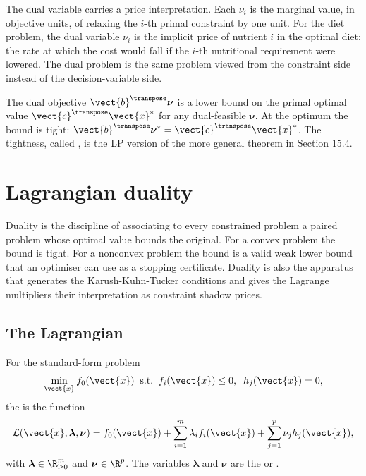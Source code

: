 The dual variable carries a price interpretation. Each $\nu_{i}$
is the marginal value, in objective units, of relaxing the
$i$-th primal constraint by one unit. For the diet problem, the
dual variable $\nu_{i}$ is the implicit price of nutrient $i$ in
the optimal diet: the rate at which the cost would fall if the
$i$-th nutritional requirement were lowered. The dual problem is
the same problem viewed from the constraint side instead of the
decision-variable side.

The dual objective $\vect{b}^{\transpose} \boldsymbol{\nu}$ is a
lower bound on the primal optimal value $\vect{c}^{\transpose}
\vect{x}^{*}$ for any dual-feasible $\boldsymbol{\nu}$. At the
optimum the bound is tight: $\vect{b}^{\transpose}
\boldsymbol{\nu}^{*} = \vect{c}^{\transpose} \vect{x}^{*}$. The
tightness, called , is the LP version of
the more general theorem in Section 15.4.

\section{Lagrangian duality}

Duality is the discipline of associating to every constrained
problem a paired problem whose optimal value bounds the original.
For a convex problem the bound is tight. For a nonconvex problem
the bound is a valid weak lower bound that an optimiser can use
as a stopping certificate. Duality is also the apparatus that
generates the Karush-Kuhn-Tucker conditions and gives the
Lagrange multipliers their interpretation as constraint shadow
prices.

\subsection{The Lagrangian}

\begin{definition}[Lagrangian]
For the standard-form problem
\[
\min_{\vect{x}} f_{0}(\vect{x}) \;\;\text{s.t.}\;\; f_{i}(\vect{x})
\leq 0, \;\; h_{j}(\vect{x}) = 0,
\]
the  is the function
\[
\mathcal{L}(\vect{x}, \boldsymbol{\lambda}, \boldsymbol{\nu}) =
f_{0}(\vect{x})
+ \sum_{i=1}^{m} \lambda_{i} f_{i}(\vect{x})
+ \sum_{j=1}^{p} \nu_{j} h_{j}(\vect{x}),
\]
with $\boldsymbol{\lambda} \in \R^{m}_{\geq 0}$ and
$\boldsymbol{\nu} \in \R^{p}$. The variables $\boldsymbol{\lambda}$
and $\boldsymbol{\nu}$ are the  or
.
\end{definition}

